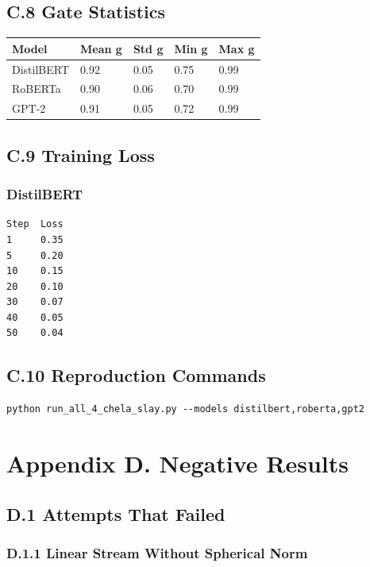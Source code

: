 \subsection{C.8 Gate Statistics}

\begin{table}[H]
\centering
\small
\begin{tabular}{lllll}
\toprule
\textbf{Model} & \textbf{Mean g} & \textbf{Std g} & \textbf{Min g} & \textbf{Max g} \\
\midrule
DistilBERT & 0.92 & 0.05 & 0.75 & 0.99 \\
RoBERTa & 0.90 & 0.06 & 0.70 & 0.99 \\
GPT-2 & 0.91 & 0.05 & 0.72 & 0.99 \\
\bottomrule
\end{tabular}
\end{table}

\subsection{C.9 Training Loss}

\subsubsection{DistilBERT}
\begin{lstlisting}
Step  Loss
1     0.35
5     0.20
10    0.15
20    0.10
30    0.07
40    0.05
50    0.04
\end{lstlisting}

\subsection{C.10 Reproduction Commands}

\begin{lstlisting}
python run_all_4_chela_slay.py --models distilbert,roberta,gpt2
\end{lstlisting}



\section{Appendix D. Negative Results}

\subsection{D.1 Attempts That Failed}

\subsubsection{D.1.1 Linear Stream Without Spherical Norm}

